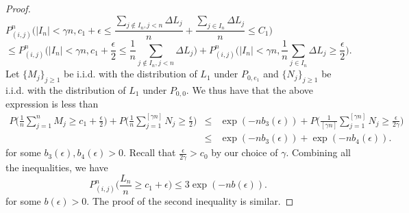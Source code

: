 \documentclass[11pt]{amsart}
\begin{document}
\begin{proof}
\[P_{(i,j)}^n\Big( \vert I_n \vert < \gamma n, c_1+\epsilon \le \frac{ \sum_{ j \notin I_n,j <n } \Delta L_j }{n} + \frac{ \sum_{ j \in I_n } \Delta L_j }{n} \le C_1 \Big) \hspace{5cm}\]
\[ \le P_{(i,j)}^n\Big( \vert I_n \vert < \gamma n, c_1+\frac{\epsilon}{2} \le \frac{1}{n} \sum_{j \notin I_n, j<n} \Delta L_j \Big) +  P_{(i,j)}^n\Big( \vert I_n \vert < \gamma n,  \frac{1}{n} \sum_{j \in I_n} \Delta L_j \ge \frac{\epsilon}{2} \Big).\]
Let $\{M_j\}_{j\ge 1}$ be i.i.d. with the distribution of $L_1$ under $P_{0,e_1}$ and $\{N_j\}_{j\ge 1}$ be i.i.d. with the distribution of $L_1$ under $P_{0,0}$. We thus have that the above expression is less than
\begin{eqnarray*}
  P\Big( \frac{1}{n}\sum_{j=1}^n M_j \ge c_1 +\frac{\epsilon}{2} \Big) +P\Big( \frac{1}{n} \sum_{j=1}^{[\gamma n]} N_j \ge \frac{\epsilon}{2} \Big) & \le & \exp(-nb_3(\epsilon)) + P\Big( \frac{1}{[\gamma n]} \sum_{j=1}^{[\gamma n]} N_j \ge \frac{\epsilon}{2\gamma} \Big) \\
 &\le& \exp(-nb_3(\epsilon))+\exp(-nb_4(\epsilon)).
 \end{eqnarray*}
for some $b_3(\epsilon), b_4(\epsilon)>0$. Recall that $\frac{\epsilon}{2\gamma} > c_0$ by our choice of $\gamma$. Combining all the inequalities, we have 
\[P_{(i,j)}^n\big( \frac{L_n}{n} \ge c_1 + \epsilon \big) \le 3 \exp(-nb(\epsilon)). \]
for some $b(\epsilon)>0$. The proof of the second inequality is similar. 
\end{proof} 
 
 
\end{document}
